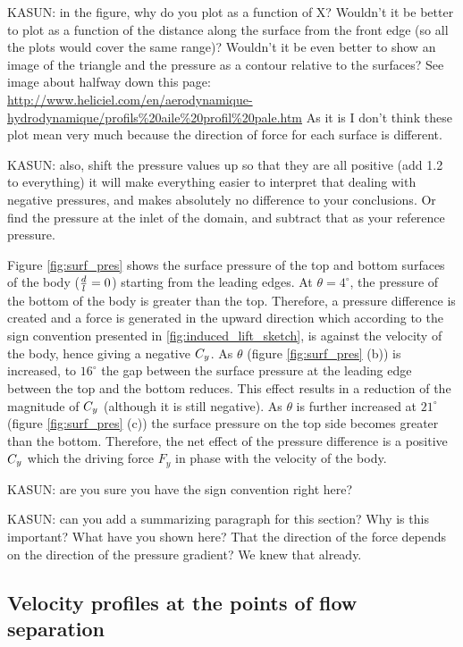  

KASUN: in the figure, why do you plot as a function of X? Wouldn't it be better to plot as a function of the distance along the surface from the front edge (so all the plots would cover the same range)? Wouldn't it be even better to show an image of the triangle and the pressure as a contour relative to the surfaces? See image about halfway down this page: \url{http://www.heliciel.com/en/aerodynamique-hydrodynamique/profils\%20aile\%20profil\%20pale.htm} As it is I don't think these plot mean very much because the direction of force for each surface is different.

KASUN: also, shift the pressure values up so that they are all positive (add 1.2 to everything) it will make everything easier to interpret that dealing with negative pressures, and makes absolutely no difference to your conclusions. Or find the pressure at the inlet of the domain, and subtract that as your reference pressure.
 
Figure \ref{fig:surf_pres} shows the surface pressure of the top and bottom surfaces of the body ($\frac{d}{l}=0$) starting from  the leading edges. At $\theta=4^{\circ}$, the pressure of the bottom of the body is greater than the top. Therefore, a pressure difference is created and a force is generated in the upward direction which according to the sign convention presented in \ref{fig:induced_lift_sketch}, is against the velocity of the body, hence giving a negative $C_{y}$. As $\theta$ (figure \ref{fig:surf_pres} (b)) is increased, to $16^{\circ}$ the gap between the surface pressure at the leading edge between the top and the bottom reduces. This effect results in a reduction of the magnitude of $C_{y}$ (although it is still negative). As $\theta$ is further increased at $21^{\circ}$ (figure \ref{fig:surf_pres} (c)) the surface pressure on the top side becomes greater than the bottom. Therefore, the net effect of the pressure difference is a positive $C_{y}$ which the driving force $F_y$ in phase with the velocity of the body.

KASUN: are you sure you have the sign convention right here?

KASUN: can you add a summarizing paragraph for this section? Why is this important? What have you shown here? That the direction of the force depends on the direction of the pressure gradient? We knew that already.

\subsection{Velocity profiles at the points of flow separation}

